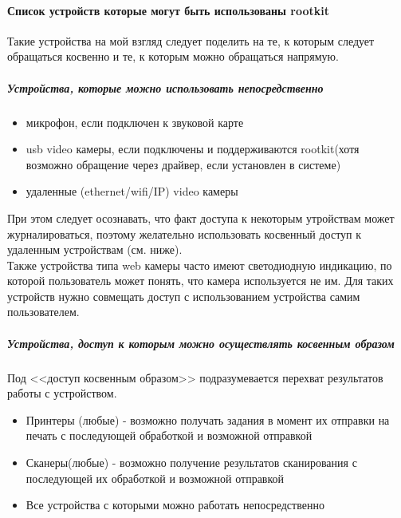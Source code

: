 \paragraph{Список устройств которые могут быть использованы rootkit\\}

Такие устройства на мой взгляд следует поделить на те, к которым следует
обращаться косвенно и те, к которым можно обращаться напрямую.

\subparagraph{Устройства, которые можно использовать непосредственно\\}

\begin{itemize}

\item{ микрофон, если подключен к звуковой карте }

\item{usb video камеры, если подключены и поддерживаются rootkit(хотя возможно обращение
через драйвер, если установлен в системе)}

\item{удаленные (ethernet/wifi/IP) video камеры}

\end{itemize}

При этом следует осознавать, что факт доступа к некоторым утройствам
может журналироваться,  поэтому желательно использовать косвенный доступ
к удаленным устройствам (см. ниже).\\

Также устройства типа web камеры часто имеют светодиодную индикацию, по которой
пользователь может понять, что камера используется не им. Для таких устройств
нужно совмещать доступ с использованием устройства самим пользователем.

\subparagraph{Устройства, доступ к которым можно осуществлять косвенным образом}

Под <<доступ косвенным образом>> подразумевается перехват результатов работы с устройством.

\begin{itemize}

\item{Принтеры (любые) - возможно получать задания в момент их отправки на печать с
последующей обработкой и возможной отправкой
}

\item{ Сканеры(любые) - возможно получение результатов сканирования с последующей их обработкой и возможной отправкой }

\item{Все устройства с которыми можно работать непосредственно}

\end{itemize}

